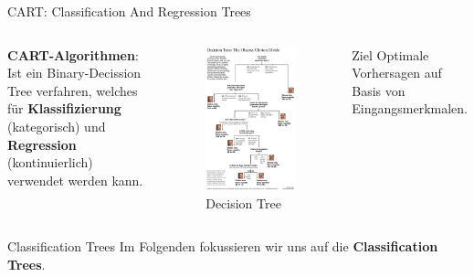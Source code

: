 \documentclass{beamer}
\begin{document}
\begin{frame}{CART: Classification And Regression Trees}
	\begin{columns}
		\textbf{CART-Algorithmen}: Ist ein Binary-Decission Tree verfahren, welches für \textbf{Klassifizierung} (kategorisch) und \textbf{Regression} (kontinuierlich) verwendet werden kann.
			\begin{figure}
				\includegraphics[width=\linewidth]{Images/0416-nat-subOBAMA.jpg}
				\caption{Decision Tree \cite{Charbuty2021ClassificationBO}}
			\end{figure}
			
			\pause
			\begin{alertblock}{Ziel}
				Optimale Vorhersagen auf Basis von Eingangsmerkmalen.			
			\end{alertblock}
	\end{columns}
		
	
	\pause
	\begin{alertblock}{Classification Trees}
		Im Folgenden fokussieren wir uns auf die  \textbf{Classification Trees}.
	\end{alertblock}
\end{frame}
\end{document}
